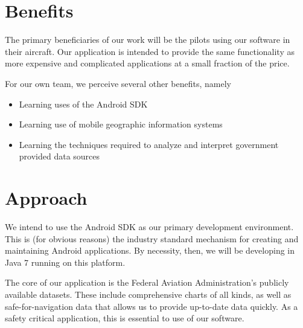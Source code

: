 \documentclass[10pt,a4paper]{article}
\begin{document}
\section{Benefits}
The primary beneficiaries of our work will be the pilots using our software in their aircraft. Our application is intended to provide the same functionality as more expensive and complicated applications at a small fraction of the price.

For our own team, we perceive several other benefits, namely
\begin{itemize}
\item Learning uses of the Android SDK
\item Learning use of mobile geographic information systems
\item Learning the techniques required to analyze and interpret government provided data sources
\end{itemize}

\section{Approach}
We intend to use the Android SDK as our primary development environment. This is (for obvious reasons) the industry standard mechanism for creating and maintaining Android applications. By necessity, then, we will be developing in Java 7 running on this platform. 

The core of our application is the Federal Aviation Administration's publicly available datasets. These include comprehensive charts of all kinds, as well as safe-for-navigation data that allows us to provide up-to-date data quickly. As a safety critical application, this is essential to use of our software.
\end{document}
